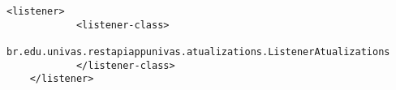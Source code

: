 \begin{lstlisting}[style=custom_XML]
	<listener>
			<listener-class>
					br.edu.univas.restapiappunivas.atualizations.ListenerAtualizations
			</listener-class>
	</listener>
\end{lstlisting}